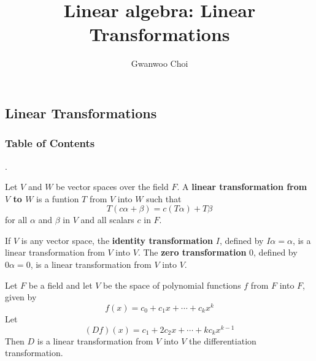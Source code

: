 \documentclass[8pt]{beamer}
\title{Linear algebra: Linear Transformations}
\author{Gwanwoo Choi}
\newcommand{\tb}[1]{\textbf{#1}}
\begin{document}

\begin{frame}
    \titlepage
\end{frame}

\subsection{Linear Transformations}
\begingroup
    \begin{frame}
        \frametitle{Table of Contents}
        \tableofcontents[currentsubsection]
    \end{frame}
\endgroup


\begin{frame}{.}
    \begin{definition}
        Let $V$ and $W$ be vector spaces over the field $F$. A \tb{linear transformation from $V$ to $W$} is a funtion $T$ from $V$ into $W$ such that
        \[
            T(c\alpha + \beta) = c (T\alpha) + T\beta
        \]
        for all $\alpha$ and $\beta$ in $V$ and all scalars $c$ in $F$.
    \end{definition}

    \begin{example}
        If $V$ is any vector space, the \tb{identity transformation} $I$, defined by $I\alpha = \alpha$, is a linear transformation from $V$ into $V$.
        The \tb{zero transformation} 0, defined by $0 \alpha = 0$, is a linear transformation from $V$ into $V$.
    \end{example}

    \begin{example}
        Let $F$ be a field and let $V$ be the space of polynomial functions $f$ from $F$ into $F$, given by
        \[
            f(x) = c_0 + c_1 x + \cdots + c_k x^k
        \]
        Let 
        \[
            (Df) (x) = c_1 + 2 c_2 x + \cdots + k c_k x^{k-1}
        \]
        Then $D$ is a linear transformation from $V$ into $V$ the differentiation transformation.
    \end{example}
\end{frame}
\end{document}

